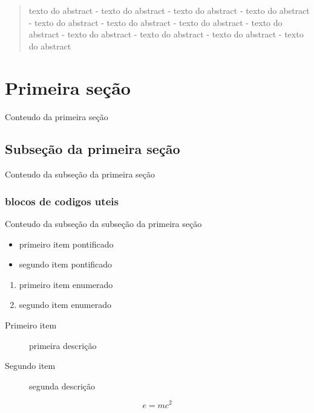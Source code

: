 \documentclass[12pt,a4paper]{article}
\begin{document}


\newpage
\tableofcontents
\thispagestyle{empty}
\newpage




\begin{abstract}
texto do abstract - texto do abstract - texto do abstract - texto do abstract - texto do abstract - texto do abstract - texto do abstract - texto do abstract - texto do abstract - texto do abstract - texto do abstract - texto do abstract
\end{abstract}

\section{Primeira seção}
Conteudo da primeira seção

\subsection{Subseção da primeira seção}
Conteudo da subseção da primeira seção

\subsubsection{blocos de codigos uteis}
Conteudo da subseção da subseção da primeira seção

\begin{itemize}
\item primeiro item pontificado
\item segundo item pontificado
\end{itemize}

\begin{enumerate}
\item primeiro item enumerado
\item segundo item enumerado
\end{enumerate}

\begin{description}
\item[Primeiro item] primeira descrição
\item[Segundo item] segunda descrição
\end{description}

\begin{equation}
e = mc^2
\end{equation}
\end{document}
